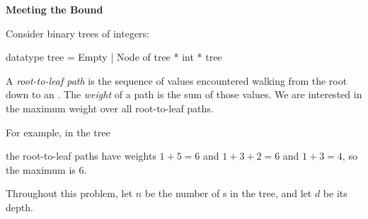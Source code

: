 
\textbf{Meeting the Bound}

Consider binary trees of integers:

\begin{codeblock}
  datatype tree = Empty | Node of tree * int * tree
\end{codeblock}

A \textit{root-to-leaf path} is the sequence of values encountered walking from
the root down to an . The \textit{weight} of a path is the sum of
those values. We are interested in the maximum weight over all root-to-leaf
paths.

For example, in the tree

\begin{center}
\end{center}

the root-to-leaf paths have weights $1 + 5 = 6$ and $1 + 3 + 2 = 6$ and
$1 + 3 = 4$, so the maximum is $6$.

Throughout this problem, let $n$ be the number of s in the tree, and
let $d$ be its depth.

